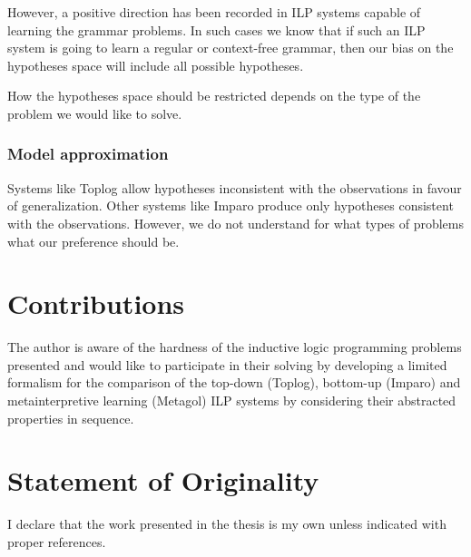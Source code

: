 However, a positive direction has been recorded in ILP systems capable of learning the grammar problems. In such cases we know that if such an ILP system is going to learn a regular or context-free grammar, then our bias on the hypotheses space will include all possible hypotheses.

How the hypotheses space should be restricted depends on the type of the problem we would like to solve.

\subsubsection{Model approximation}
Systems like Toplog allow hypotheses inconsistent with the observations in favour of generalization. Other systems like Imparo produce only hypotheses consistent with the observations. However, we do not understand for what types of problems what our preference should be.


\section{Contributions}
The author is aware of the hardness of the inductive logic programming problems presented and would like to participate in their solving by developing a limited formalism for the comparison of the top-down (Toplog), bottom-up (Imparo) and metainterpretive learning (Metagol) ILP systems by considering their abstracted properties in sequence.


\section{Statement of Originality}

I declare that the work presented in the thesis is my own unless indicated with proper references.